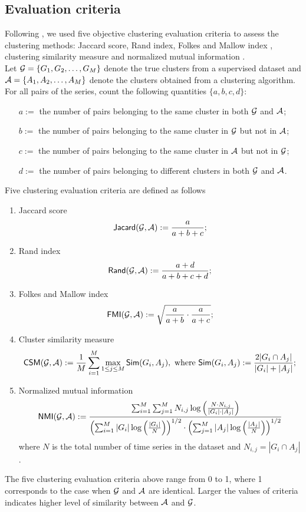 \documentclass{article} %
\begin{document}
\subsection{Evaluation criteria}
Following \citet{wt_05}, we used five objective clustering evaluation criteria to assess the clustering methods: Jaccard score, Rand index, Folkes and Mallow index \citep{cv_01}, clustering similarity measure \citep{csm_00} and normalized mutual information \citep{nmi_02}.\\
Let ${\cal G}=\{G_1,G_2,\ldots,G_M\}$ denote the true clusters from a supervised dataset and ${\cal A}=\{A_1,A_2,\ldots,A_M\}$ denote the clusters obtained from a clustering algorithm. For all pairs of the series, count the following quantities $\{a,b,c,d\}$:
\begin{itemize}
\item[$a:=$] the number of pairs belonging to the same cluster in both $\cal G$ and $\cal A$;
\item[$b:=$] the number of pairs belonging to the same cluster in $\cal G$ but not in $\cal A$;
\item[$c:=$] the number of pairs belonging to the same cluster in $\cal A$ but not in $\cal G$;
\item[$d:=$] the number of pairs belonging to different clusters in both $\cal G$ and $\cal A$. 
\end{itemize} 
Five clustering evaluation criteria are defined as follows 
\begin{enumerate}
\item Jaccard score
\[{\sf Jacard}({\cal G},{\cal A}):=\frac{a}{a+b+c};\]
\item Rand index
\[{\sf Rand}({\cal G},{\cal A}):=\frac{a+d}{a+b+c+d};\]
\item Folkes and Mallow index
\[{\sf FMI}({\cal G},{\cal A}):=\sqrt{\frac{a}{a+b}\cdot\frac{a}{a+c}};\]
\item Cluster similarity measure
\[{\sf CSM}({\cal G},{\cal A}):=\frac{1}{M}\sum_{i=1}^M\max_{1\leq j\leq M}{\sf Sim}(G_i,A_j),~\mbox{where}~{\sf Sim}(G_i,A_j):=\frac{2|G_i\cap A_j|}{|G_i|+|A_j|};\]
\item Normalized mutual information
\[{\sf NMI}({\cal G},{\cal A}):=\frac{\sum_{i=1}^M\sum_{j=1}^MN_{i,j}\log\left(\frac{N\cdot N_{i,j}}{|G_i|\cdot|A_j|}\right)}{\left(\sum_{i=1}^M|G_i|\log\left(\frac{|G_i|}{N}\right)\right)^{1/2}\cdot\left(\sum_{j=1}^M|A_j|\log\left(\frac{|A_j|}{N}\right)\right)^{1/2}}\]
where $N$ is the total number of time series in the dataset and $N_{i,j}=|G_i\cap A_j|$.
\end{enumerate}
The five clustering evaluation criteria above range from 0 to 1, where 1 corresponds to the case when $\cal G$ and $\cal A$ are identical. Larger the values of criteria indicates higher level of similarity between $\cal A$ and $\cal G$.
\end{document}
